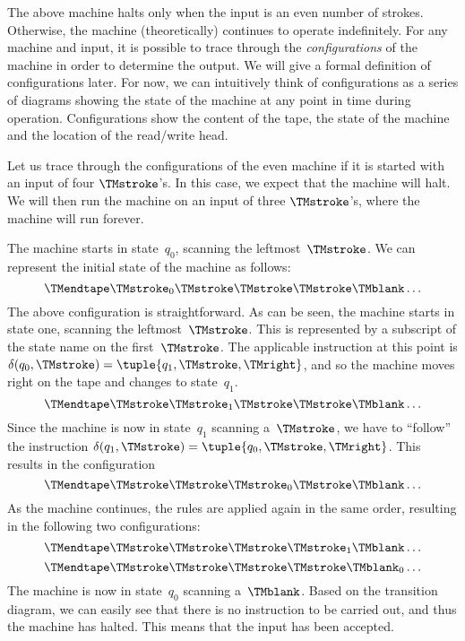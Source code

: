 \documentclass[../../../include/open-logic-section]{subfiles}
\begin{document}
\begin{explain}
The above machine halts only when the input is an even number of strokes.
Otherwise, the machine (theoretically) continues to operate indefinitely. 
For any machine and input, it is possible to trace through the 
\emph{configurations} of the machine in order to determine the output. 
We will give a formal definition of configurations later. For now,
we can intuitively think of configurations as a series of diagrams showing the 
state of the machine at any point in time during operation.
Configurations show the content of the tape, the state of the machine and the
location of the read/write head.

Let us trace through the configurations of the even machine if it is
started with an input of four $\TMstroke$'s. In this case, we expect that the
machine will halt.  We will then run the machine on an input of three
$\TMstroke$'s, where the machine will run forever.

The machine starts in state~$q_0$, scanning the leftmost~$\TMstroke$.
We can represent the initial state of the machine as follows:
\[
\TMendtape \TMstroke_0 \TMstroke \TMstroke \TMstroke \TMblank \ldots
\]
The above configuration is straightforward. As can be seen, the
machine starts in state one, scanning the leftmost~$\TMstroke$. This
is represented by a subscript of the state name on the
first~$\TMstroke$. The applicable instruction at this point is
$\delta(q_0, \TMstroke) = \tuple{q_1, \TMstroke, \TMright}$, and so
the machine moves right on the tape and changes to state~$q_1$.
\[
\TMendtape \TMstroke \TMstroke_1 \TMstroke \TMstroke \TMblank \ldots
\]
Since the machine is now in state~$q_1$ scanning a~$\TMstroke$, we have to
``follow'' the instruction $\delta(q_1, \TMstroke) = \tuple{q_0,
  \TMstroke, \TMright}$. This results in the configuration
\[
\TMendtape \TMstroke \TMstroke \TMstroke_0 \TMstroke \TMblank \ldots
\]
As the machine continues, the rules are applied again in the same
order, resulting in the following two configurations:
\[
\TMendtape \TMstroke \TMstroke \TMstroke \TMstroke_1 \TMblank \ldots
\]
\[
\TMendtape \TMstroke \TMstroke \TMstroke \TMstroke \TMblank_0 \ldots
\]
The machine is now in state~$q_0$ scanning a~$\TMblank$. Based on the
transition diagram, we can easily see that there is no instruction to be
carried out, and thus the machine has halted. This means that the input
has been accepted.


\end{explain}
\end{document}
